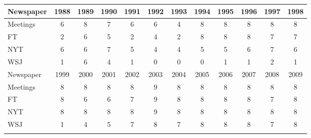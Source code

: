 \begin{tabular}{lccccccccccc}
\hline\hline 
\addlinespace 
Newspaper & 1988 & 1989 & 1990 & 1991 & 1992 & 1993 & 1994 & 1995 & 1996 & 1997 & 1998 \\ 
\hline 
Meetings & 6 & 8 & 7 & 6 & 6 & 4 & 8 & 8 & 8 & 8 & 8 \\
FT & 2 & 6 & 5 & 2 & 4 & 2 & 8 & 8 & 8 & 7 & 7 \\
NYT & 6 & 6 & 7 & 5 & 4 & 4 & 5 & 5 & 6 & 7 & 6 \\
WSJ & 1 & 6 & 4 & 1 & 0 & 0 & 0 & 1 & 1 & 2 & 1 \\
\hline 
\addlinespace 
Newspaper & 1999 & 2000 & 2001 & 2002 & 2003 & 2004 & 2005 & 2006 & 2007 & 2008 & 2009 \\ 
\hline 
Meetings & 8 & 8 & 8 & 8 & 9 & 8 & 8 & 8 & 8 & 8 & 8 \\
FT & 8 & 6 & 6 & 7 & 9 & 8 & 8 & 8 & 8 & 7 & 8 \\
NYT & 8 & 8 & 8 & 8 & 9 & 8 & 8 & 8 & 8 & 8 & 8 \\
WSJ & 1 & 4 & 5 & 7 & 8 & 7 & 8 & 8 & 8 & 7 & 8 \\
\hline 
\addlinespace 
\end{tabular}